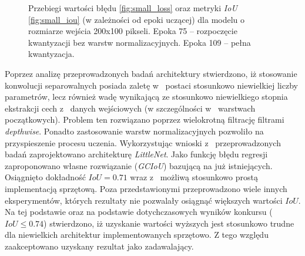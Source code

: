 \begin{figure}
    \caption{Przebiegi wartości błędu \ref{fig:small_loss} oraz metryki \emph{IoU} \ref{fig:small_iou} (w zależności od epoki uczącej) dla modelu o~ rozmiarze wejścia 200x100 pikseli.
    Epoka 75 -- rozpoczęcie kwantyzacji bez warstw normalizacyjnych. Epoka 109 -- pełna kwantyzacja.}
    \label{fig:three_step_train}
\end{figure}


Poprzez analizę przeprowadzonych badań architektury stwierdzono, iż stosowanie konwolucji separowalnych posiada zaletę w~ postaci stosunkowo niewielkiej liczby parametrów, lecz również wadę wynikającą ze stosunkowo niewielkiego stopnia ekstrakcji cech z~ danych wejściowych (w szczególności w~ warstwach początkowych). 
Problem ten rozwiązano poprzez wielokrotną filtrację filtrami \emph{depthwise}.
Ponadto zastosowanie warstw normalizacyjnych pozwoliło na przyspieszenie procesu uczenia.
Wykorzystując wnioski z~ przeprowadzonych badań zaprojektowano architekturę \emph{LittleNet}.
Jako funkcję błędu regresji zaproponowano własne rozwiązanie (\emph{GCIoU}) bazującą na już istniejących.
Osiągnięto dokładność $IoU = 0.71$ wraz z~ możliwą stosunkowo prostą implementacją sprzętową.
Poza przedstawionymi przeprowadzono wiele innych eksperymentów, 
których rezultaty nie pozwalały osiągnąć większych wartości $IoU$.
Na tej podstawie oraz na podstawie dotychczasowych wyników konkursu ($IoU \leq 0.74$) stwierdzono, 
iż uzyskanie wartości wyższych jest stosunkowo trudne dla niewielkich architektur implementowanych sprzętowo.
Z tego względu zaakceptowano uzyskany rezultat jako zadawalający.